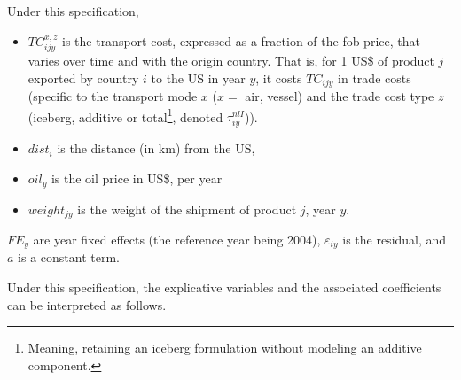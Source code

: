 \documentclass[a4paper,11pt]{article}
\begin{document}
Under this specification,
\begin{itemize}
\item $TC^{x,z}_{ijy}$ is the transport cost, expressed as a fraction of the fob price, that varies over time and with the origin country. That is, for 1 US\$ of product $j$ exported by country $i$ to the US in year $y$, it costs $TC_{ijy}$ in trade costs (specific to the transport mode $x$ ($x=$ air, vessel) and the trade cost type $z$ (iceberg, additive or total\footnote{Meaning, retaining an iceberg formulation without modeling an additive component.}, denoted $\tau_{iy}^{nlI}$)).
\item $dist_i$ is the distance (in km) from the US,
\item $oil_{y}$ is the oil price in US\$, per year
\item $weight_{jy}$ is the weight of the shipment of product $j$, year $y$. 
\end{itemize}

$FE_y$ are year fixed effects (the reference year being 2004), $\varepsilon_{iy}$ is the residual, and $a$ is a constant term.\smallskip

Under this specification, the explicative variables and the associated coefficients can be interpreted as follows.
\end{document}
